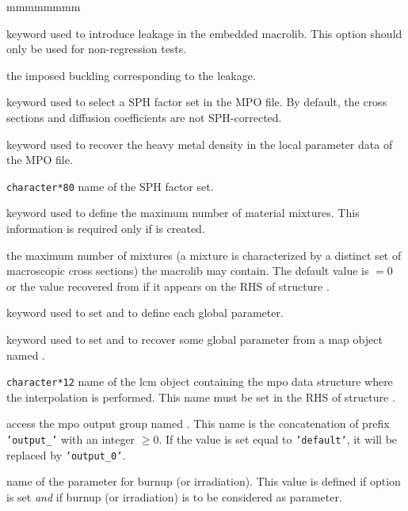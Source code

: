 \begin{ListeDeDescription}{mmmmmmmm}
\item[\moc{LEAK}] keyword used to introduce leakage in the embedded {\sc macrolib}. This option should only be used for non-regression tests.

\item[\dusa{b2}] the imposed buckling corresponding to the leakage.

\item[\moc{EQUI}] keyword used to select a SPH factor set in the MPO file. By default, the cross sections and diffusion coefficients
are not SPH-corrected.

\item[\moc{MASL}] keyword used to recover the heavy metal density in the local parameter data of the MPO file. 

\item[\dusa{text80}] {\tt character*80} name of the SPH factor set.

\item[\moc{NMIX}] keyword used to define the maximum number of material mixtures. This information is required only if  is created.

\item[\dusa{nmixt}] the maximum number of mixtures (a mixture is characterized by a distinct set of 
macroscopic cross sections) the {\sc macrolib} may contain. The default value is  $=0$ or the value recovered from  if it appears on the RHS
of structure .

\item[\moc{MPO}] keyword used to set  and to define each global parameter.

\item[\moc{TABLE}] keyword used to set  and to recover some global parameter from a {\sc map} object named .

\item[\dusa{MPONAM}] {\tt character*12} name of the {\sc lcm} object containing the
{\sc mpo} data structure where the interpolation is performed. This name must be set in the RHS of structure .

\item[\dusa{NAMDIR}] access the {\sc mpo} output group named . This name is the concatenation of prefix {\tt 'output\_'} with an integer $\ge 0$.
If the value is set equal to {\tt 'default'}, it will be replaced by {\tt 'output\_0'}.

\item[\dusa{namburn}] name of the parameter for burnup (or irradiation).
This value is defined if option  is set {\sl and} if burnup (or irradiation) is to be considered as parameter.


\end{ListeDeDescription}
